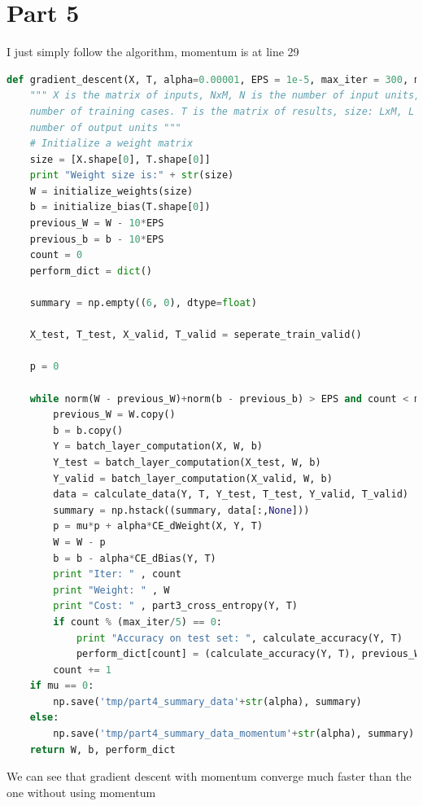 \documentclass[12pt]{article}
\begin{document}
\section*{Part 5}
I just simply follow the algorithm, momentum is at line 29
\begin{lstlisting}[language=Python]
def gradient_descent(X, T, alpha=0.00001, EPS = 1e-5, max_iter = 300, mu = 0):
    """ X is the matrix of inputs, NxM, N is the number of input units, M is the 
    number of training cases. T is the matrix of results, size: LxM, L is the 
    number of output units """
    # Initialize a weight matrix
    size = [X.shape[0], T.shape[0]]
    print "Weight size is:" + str(size)
    W = initialize_weights(size)
    b = initialize_bias(T.shape[0])
    previous_W = W - 10*EPS
    previous_b = b - 10*EPS
    count = 0
    perform_dict = dict()

    summary = np.empty((6, 0), dtype=float)

    X_test, T_test, X_valid, T_valid = seperate_train_valid()

    p = 0
    
    while norm(W - previous_W)+norm(b - previous_b) > EPS and count < max_iter:
        previous_W = W.copy()
        b = b.copy()
        Y = batch_layer_computation(X, W, b)
        Y_test = batch_layer_computation(X_test, W, b)
        Y_valid = batch_layer_computation(X_valid, W, b)
        data = calculate_data(Y, T, Y_test, T_test, Y_valid, T_valid)
        summary = np.hstack((summary, data[:,None]))
        p = mu*p + alpha*CE_dWeight(X, Y, T)
        W = W - p
        b = b - alpha*CE_dBias(Y, T)
        print "Iter: " , count
        print "Weight: " , W
        print "Cost: " , part3_cross_entropy(Y, T)
        if count % (max_iter/5) == 0:
            print "Accuracy on test set: ", calculate_accuracy(Y, T)
            perform_dict[count] = (calculate_accuracy(Y, T), previous_W, previous_b)
        count += 1
    if mu == 0:
        np.save('tmp/part4_summary_data'+str(alpha), summary)
    else:
        np.save('tmp/part4_summary_data_momentum'+str(alpha), summary)
    return W, b, perform_dict
\end{lstlisting}
We can see that gradient descent with momentum converge much faster than the one without using momentum
\end{document}
